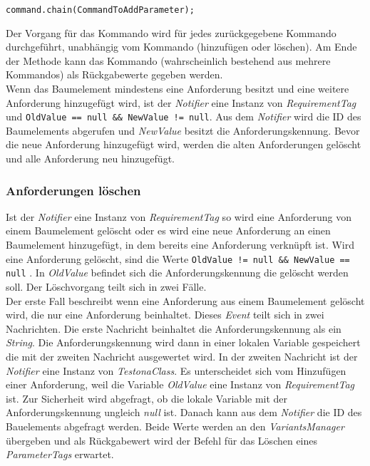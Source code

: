 \begin{lstlisting}
command.chain(CommandToAddParameter);
\end{lstlisting}

Der Vorgang für das Kommando wird für jedes zurückgegebene Kommando durchgeführt, unabhängig vom Kommando (hinzufügen oder löschen). Am Ende der Methode kann das Kommando (wahrscheinlich bestehend aus mehrere Kommandos) als Rückgabewerte gegeben werden.\\


Wenn das Baumelement mindestens eine Anforderung besitzt und eine weitere Anforderung hinzugefügt wird, ist der \textit{Notifier} eine Instanz von \textit{RequirementTag} und \texttt{OldValue == null \&\& NewValue != null}. Aus dem \textit{Notifier} wird die ID des Baumelements abgerufen und \textit{NewValue} besitzt die Anforderungskennung. Bevor die neue Anforderung hinzugefügt wird, werden die alten Anforderungen gelöscht und alle Anforderung neu hinzugefügt.\\


\subsubsection{Anforderungen löschen}
Ist der \textit{Notifier} eine Instanz von \textit{RequirementTag} so wird eine Anforderung von einem Baumelement gelöscht oder es wird eine neue Anforderung an einen Baumelement hinzugefügt, in dem bereits eine Anforderung verknüpft ist. Wird eine Anforderung gelöscht, sind die Werte \texttt{OldValue != null \&\& NewValue == null} . In \textit{OldValue} befindet sich die Anforderungskennung die gelöscht werden soll. Der Löschvorgang teilt sich in zwei Fälle.\\


Der erste Fall beschreibt wenn eine Anforderung aus einem Baumelement gelöscht wird, die nur eine Anforderung beinhaltet. Dieses \textit{Event} teilt sich in zwei Nachrichten. Die erste Nachricht beinhaltet die Anforderungskennung als ein \textit{String}. Die Anforderungskennung wird dann in einer lokalen Variable gespeichert die mit der zweiten Nachricht ausgewertet wird. In der zweiten Nachricht ist der \textit{Notifier} eine Instanz von \textit{TestonaClass}. Es unterscheidet sich vom Hinzufügen einer Anforderung, weil die Variable \textit{OldValue} eine Instanz von \textit{RequirementTag} ist. Zur Sicherheit wird abgefragt, ob die lokale Variable mit der Anforderungskennung ungleich \textit{null} ist. Danach kann aus dem \textit{Notifier} die ID des Bauelements abgefragt werden. Beide Werte werden an den \textit{VariantsManager} übergeben und als Rückgabewert wird der Befehl für das Löschen eines \textit{ParameterTags}  erwartet.\\


